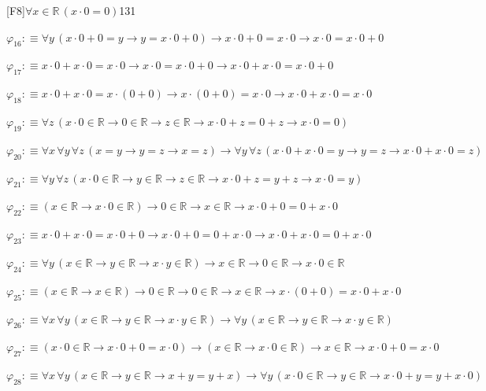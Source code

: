 \begin{fullproof}{[F8]}{$\forall x \in \mathbb{R}\,(x \cdot 0 = 0)$}{131}
\begin{abbrevlist}
\item $\varphi_{16} :\equiv \forall y\,(x \cdot 0 + 0 = y \to y = x \cdot 0 + 0) \to x \cdot 0 + 0 = x \cdot 0 \to x \cdot 0 = x \cdot 0 + 0$
\item $\varphi_{17} :\equiv x \cdot 0 + x \cdot 0 = x \cdot 0 \to x \cdot 0 = x \cdot 0 + 0 \to x \cdot 0 + x \cdot 0 = x \cdot 0 + 0$
\item $\varphi_{18} :\equiv x \cdot 0 + x \cdot 0 = x \cdot (0 + 0) \to x \cdot (0 + 0) = x \cdot 0 \to x \cdot 0 + x \cdot 0 = x \cdot 0$
\item $\varphi_{19} :\equiv \forall z\,(x \cdot 0 \in \mathbb{R} \to 0 \in \mathbb{R} \to z \in \mathbb{R} \to x \cdot 0 + z = 0 + z \to x \cdot 0 = 0)$
\item $\varphi_{20} :\equiv \forall x\,\forall y\,\forall z\,(x = y \to y = z \to x = z) \to \forall y\,\forall z\,(x \cdot 0 + x \cdot 0 = y \to y = z \to x \cdot 0 + x \cdot 0 = z)$
\item $\varphi_{21} :\equiv \forall y\,\forall z\,(x \cdot 0 \in \mathbb{R} \to y \in \mathbb{R} \to z \in \mathbb{R} \to x \cdot 0 + z = y + z \to x \cdot 0 = y)$
\item $\varphi_{22} :\equiv (x \in \mathbb{R} \to x \cdot 0 \in \mathbb{R}) \to 0 \in \mathbb{R} \to x \in \mathbb{R} \to x \cdot 0 + 0 = 0 + x \cdot 0$
\item $\varphi_{23} :\equiv x \cdot 0 + x \cdot 0 = x \cdot 0 + 0 \to x \cdot 0 + 0 = 0 + x \cdot 0 \to x \cdot 0 + x \cdot 0 = 0 + x \cdot 0$
\item $\varphi_{24} :\equiv \forall y\,(x \in \mathbb{R} \to y \in \mathbb{R} \to x \cdot y \in \mathbb{R}) \to x \in \mathbb{R} \to 0 \in \mathbb{R} \to x \cdot 0 \in \mathbb{R}$
\item $\varphi_{25} :\equiv (x \in \mathbb{R} \to x \in \mathbb{R}) \to 0 \in \mathbb{R} \to 0 \in \mathbb{R} \to x \in \mathbb{R} \to x \cdot (0 + 0) = x \cdot 0 + x \cdot 0$
\item $\varphi_{26} :\equiv \forall x\,\forall y\,(x \in \mathbb{R} \to y \in \mathbb{R} \to x \cdot y \in \mathbb{R}) \to \forall y\,(x \in \mathbb{R} \to y \in \mathbb{R} \to x \cdot y \in \mathbb{R})$
\item $\varphi_{27} :\equiv (x \cdot 0 \in \mathbb{R} \to x \cdot 0 + 0 = x \cdot 0) \to (x \in \mathbb{R} \to x \cdot 0 \in \mathbb{R}) \to x \in \mathbb{R} \to x \cdot 0 + 0 = x \cdot 0$
\item $\varphi_{28} :\equiv \forall x\,\forall y\,(x \in \mathbb{R} \to y \in \mathbb{R} \to x + y = y + x) \to \forall y\,(x \cdot 0 \in \mathbb{R} \to y \in \mathbb{R} \to x \cdot 0 + y = y + x \cdot 0)$

\end{abbrevlist}
\end{fullproof}
